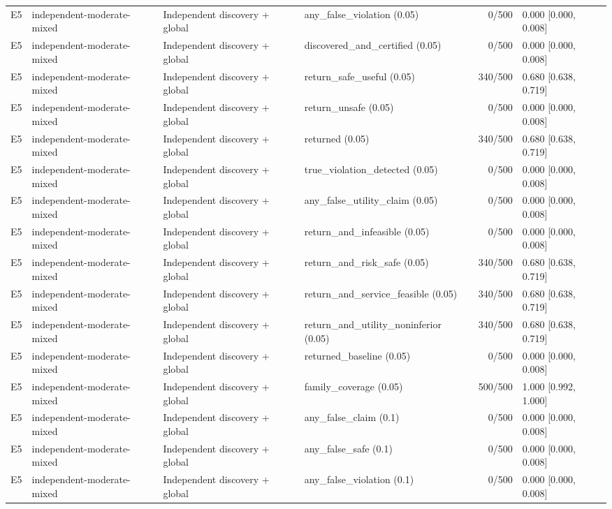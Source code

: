 \begin{longtable}{p{.04\linewidth}p{.18\linewidth}p{.19\linewidth}p{.16\linewidth}r p{.21\linewidth}}
E5 & independent-moderate-mixed & Independent discovery + global & any\_false\_violation (0.05) & 0/500 & 0.000 [0.000, 0.008]\\
E5 & independent-moderate-mixed & Independent discovery + global & discovered\_and\_certified (0.05) & 0/500 & 0.000 [0.000, 0.008]\\
E5 & independent-moderate-mixed & Independent discovery + global & return\_safe\_useful (0.05) & 340/500 & 0.680 [0.638, 0.719]\\
E5 & independent-moderate-mixed & Independent discovery + global & return\_unsafe (0.05) & 0/500 & 0.000 [0.000, 0.008]\\
E5 & independent-moderate-mixed & Independent discovery + global & returned (0.05) & 340/500 & 0.680 [0.638, 0.719]\\
E5 & independent-moderate-mixed & Independent discovery + global & true\_violation\_detected (0.05) & 0/500 & 0.000 [0.000, 0.008]\\
E5 & independent-moderate-mixed & Independent discovery + global & any\_false\_utility\_claim (0.05) & 0/500 & 0.000 [0.000, 0.008]\\
E5 & independent-moderate-mixed & Independent discovery + global & return\_and\_infeasible (0.05) & 0/500 & 0.000 [0.000, 0.008]\\
E5 & independent-moderate-mixed & Independent discovery + global & return\_and\_risk\_safe (0.05) & 340/500 & 0.680 [0.638, 0.719]\\
E5 & independent-moderate-mixed & Independent discovery + global & return\_and\_service\_feasible (0.05) & 340/500 & 0.680 [0.638, 0.719]\\
E5 & independent-moderate-mixed & Independent discovery + global & return\_and\_utility\_noninferior (0.05) & 340/500 & 0.680 [0.638, 0.719]\\
E5 & independent-moderate-mixed & Independent discovery + global & returned\_baseline (0.05) & 0/500 & 0.000 [0.000, 0.008]\\
E5 & independent-moderate-mixed & Independent discovery + global & family\_coverage (0.05) & 500/500 & 1.000 [0.992, 1.000]\\
E5 & independent-moderate-mixed & Independent discovery + global & any\_false\_claim (0.1) & 0/500 & 0.000 [0.000, 0.008]\\
E5 & independent-moderate-mixed & Independent discovery + global & any\_false\_safe (0.1) & 0/500 & 0.000 [0.000, 0.008]\\
E5 & independent-moderate-mixed & Independent discovery + global & any\_false\_violation (0.1) & 0/500 & 0.000 [0.000, 0.008]\\

\end{longtable}
